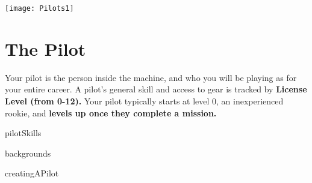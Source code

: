 \newpage
\begin{center}
    \texttt{[image: Pilots1]}
\end{center}

\chapter{The Pilot}

Your pilot is the person inside the machine, and who you will be playing as for your entire career.
A pilot's general skill and access to gear is tracked by \textbf{License Level (from 0-12).} Your pilot
typically starts at level 0, an inexperienced rookie, and \textbf{levels up once they complete a mission.} 

{pilotSkills}

{backgrounds}

{creatingAPilot}